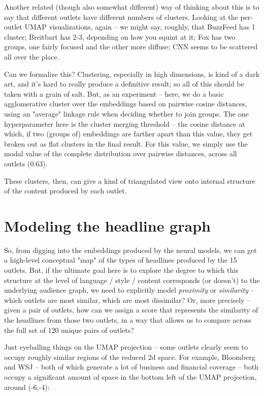 \documentclass{scrartcl}
\begin{document}
Another related (though also somewhat different) way of thinking about this is to say that different outlets have different numbers of clusters. Looking at the per-outlet UMAP visualizations, again -- we might say, roughly, that BuzzFeed has 1 cluster; Breitbart has 2-3, depending on how you squint at it; Fox has two groups, one fairly focused and the other more diffuse; CNN seems to be scattered all over the place.

Can we formalize this? Clustering, especially in high dimensions, is kind of a dark art, and it's hard to really produce a definitive result; so all of this should be taken with a grain of salt. But, as an experiment -- here, we do a basic agglomerative cluster over the embeddings based on pairwise cosine distances, using an "average" linkage rule when deciding whether to join groups. The one hyperparameter here is the cluster merging threshold -- the cosine distance at which, if two (groups of) embeddings are farther apart than this value, they get broken out as flat clusters in the final result. For this value, we simply use the modal value of the complete distribution over pairwise distances, across all outlets (0.63).


These clusters, then, can give a kind of triangulated view onto internal structure of the content produced by each outlet.


\section{Modeling the headline graph}

So, from digging into the embeddings produced by the neural models, we can get a high-level conceptual "map" of the types of headlines produced by the 15 outlets. But, if the ultimate goal here is to explore the degree to which this structure at the level of language / style / content corresponds (or doesn't) to the underlying audience graph, we need to explicitly model \textit{proximity} or \textit{similarity} -- which outlets are most similar, which are most dissimilar? Or, more precisely -- given a pair of outlets, how can we assign a score that represents the similarity of the headlines from those two outlets, in a way that allows us to compare across the full set of 120 unique pairs of outlets?

Just eyeballing things on the UMAP projection -- some outlets clearly seem to occupy roughly similar regions of the reduced 2d space. For example, Bloomberg and WSJ -- both of which generate a lot of business and financial coverage -- both occupy a significant amount of space in the bottom left of the UMAP projection, around (-6,-4):
\end{document}

